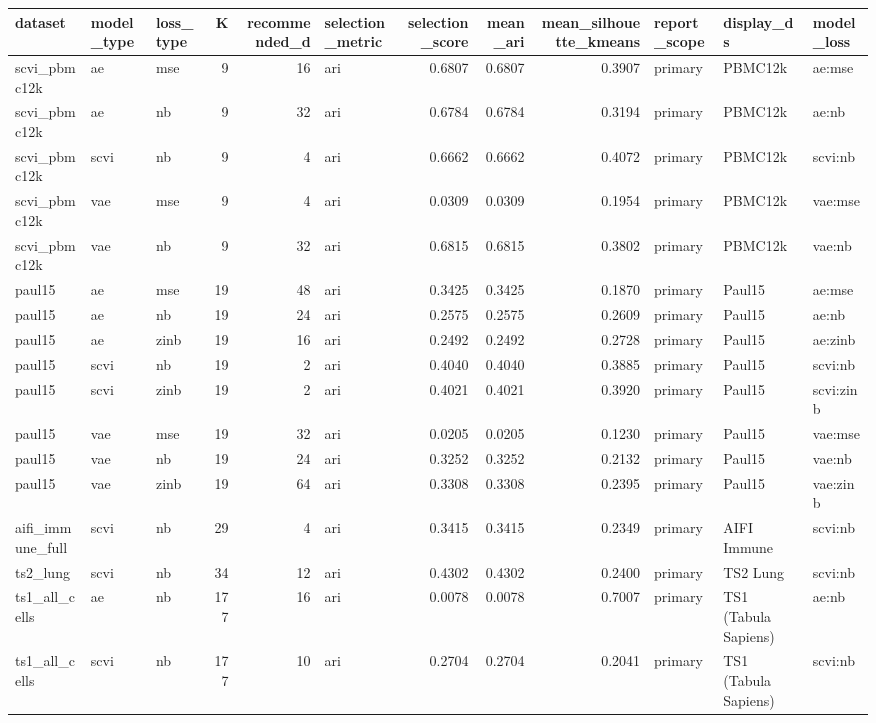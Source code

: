 \begin{tabular}{lllrrlrrrlll}
\toprule
dataset & model\_type & loss\_type & K & recommended\_d & selection\_metric & selection\_score & mean\_ari & mean\_silhouette\_kmeans & report\_scope & display\_ds & model\_loss \\
\midrule
scvi\_pbmc12k & ae & mse & 9 & 16 & ari & 0.6807 & 0.6807 & 0.3907 & primary & PBMC12k & ae:mse \\
scvi\_pbmc12k & ae & nb & 9 & 32 & ari & 0.6784 & 0.6784 & 0.3194 & primary & PBMC12k & ae:nb \\
scvi\_pbmc12k & scvi & nb & 9 & 4 & ari & 0.6662 & 0.6662 & 0.4072 & primary & PBMC12k & scvi:nb \\
scvi\_pbmc12k & vae & mse & 9 & 4 & ari & 0.0309 & 0.0309 & 0.1954 & primary & PBMC12k & vae:mse \\
scvi\_pbmc12k & vae & nb & 9 & 32 & ari & 0.6815 & 0.6815 & 0.3802 & primary & PBMC12k & vae:nb \\
paul15 & ae & mse & 19 & 48 & ari & 0.3425 & 0.3425 & 0.1870 & primary & Paul15 & ae:mse \\
paul15 & ae & nb & 19 & 24 & ari & 0.2575 & 0.2575 & 0.2609 & primary & Paul15 & ae:nb \\
paul15 & ae & zinb & 19 & 16 & ari & 0.2492 & 0.2492 & 0.2728 & primary & Paul15 & ae:zinb \\
paul15 & scvi & nb & 19 & 2 & ari & 0.4040 & 0.4040 & 0.3885 & primary & Paul15 & scvi:nb \\
paul15 & scvi & zinb & 19 & 2 & ari & 0.4021 & 0.4021 & 0.3920 & primary & Paul15 & scvi:zinb \\
paul15 & vae & mse & 19 & 32 & ari & 0.0205 & 0.0205 & 0.1230 & primary & Paul15 & vae:mse \\
paul15 & vae & nb & 19 & 24 & ari & 0.3252 & 0.3252 & 0.2132 & primary & Paul15 & vae:nb \\
paul15 & vae & zinb & 19 & 64 & ari & 0.3308 & 0.3308 & 0.2395 & primary & Paul15 & vae:zinb \\
aifi\_immune\_full & scvi & nb & 29 & 4 & ari & 0.3415 & 0.3415 & 0.2349 & primary & AIFI Immune & scvi:nb \\
ts2\_lung & scvi & nb & 34 & 12 & ari & 0.4302 & 0.4302 & 0.2400 & primary & TS2 Lung & scvi:nb \\
ts1\_all\_cells & ae & nb & 177 & 16 & ari & 0.0078 & 0.0078 & 0.7007 & primary & TS1 (Tabula Sapiens) & ae:nb \\
ts1\_all\_cells & scvi & nb & 177 & 10 & ari & 0.2704 & 0.2704 & 0.2041 & primary & TS1 (Tabula Sapiens) & scvi:nb \\
\bottomrule
\end{tabular}
